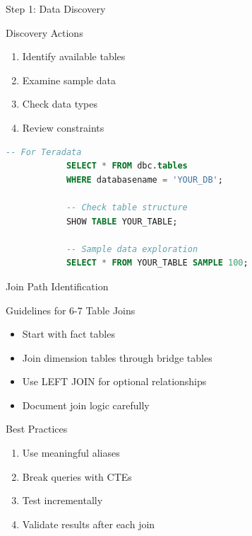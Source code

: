 \documentclass{beamer}
\begin{document}
	\begin{frame}[fragile]{Step 1: Data Discovery}
		\begin{block}{Discovery Actions}
			\begin{enumerate}
				\item Identify available tables
				\item Examine sample data
				\item Check data types
				\item Review constraints
			\end{enumerate}
		\end{block}
		\begin{lstlisting}[language=SQL, caption=Discovery Queries]
			-- For Teradata
			SELECT * FROM dbc.tables 
			WHERE databasename = 'YOUR_DB';
			
			-- Check table structure
			SHOW TABLE YOUR_TABLE;
			
			-- Sample data exploration
			SELECT * FROM YOUR_TABLE SAMPLE 100;
		\end{lstlisting}
	\end{frame}
	
	\begin{frame}{Join Path Identification}
		\begin{alertblock}{Guidelines for 6-7 Table Joins}
			\begin{itemize}
				\item Start with fact tables
				\item Join dimension tables through bridge tables
				\item Use LEFT JOIN for optional relationships
				\item Document join logic carefully
			\end{itemize}
		\end{alertblock}
		\vspace{0.3cm}
		\begin{exampleblock}{Best Practices}
			\begin{enumerate}
				\item Use meaningful aliases
				\item Break queries with CTEs
				\item Test incrementally
				\item Validate results after each join
			\end{enumerate}
		\end{exampleblock}
	\end{frame}
	
\end{document}
